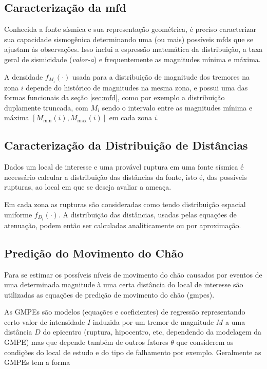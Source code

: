 \subsection{Caracterização da \glsdesc*{mfd}}
\label{sec:psha_mfd}

Conhecida a fonte sísmica e sua representação geométrica, é preciso caracterizar sua capacidade sismogênica determinando
uma (ou mais) possíveis \gls{mfd}s que se ajustam às observações. Isso inclui a espressão matemática da distribuição, a
taxa geral de sismicidade (\emph{valor-a}) e frequentemente as magnitudes mínima e máxima. 


A densidade $f_{M_i}(\cdot)$ usada para a distribuição de magnitude dos tremores na zona $i$ depende do 
histórico de magnitudes na mesma zona, e possui uma das formas funcionais da seção \ref{sec:mfd},
como por exemplo a distribuição duplamente truncada,
com $M_i$ sendo o intervalo entre as magnitudes mínima e máxima $[M_{\min}(i), M_{\max}(i)]$ 
em cada zona $i$.


\subsection{Caracterização da Distribuição de Distâncias}
\label{sec:psha_distances}

Dados um local de interesse e uma provável ruptura em uma fonte sísmica é necessário calcular a distribuição das
distâncias da fonte, isto é, das possíveis rupturas, ao local em que se deseja avaliar a ameaça.

Em cada zona as rupturas são consideradas como tendo distribuição espacial uniforme $f_{D_i}(\cdot)$.
A distribuição das distâncias, usadas pelas equações de atenuação, podem então ser calculadas 
analiticamente ou por aproximação.


\subsection{Predição do Movimento do Chão}
\label{sec:gmpe}

Para se estimar os possíveis níveis de movimento do chão causados por eventos de uma determinada magnitude à uma certa
distância do local de interesse são utilizadas as equações de predição de movimento do chão (\glspl{gmpe}).

As GMPEs são modelos (equações e coeficientes) de regressão representando certo valor de
intensidade $I$ induzida por um tremor de magnitude $M$ a uma distância $D$ do epicentro (ruptura, hipocentro, etc, dependendo da
modelagem da GMPE) mas que depende também de outros fatores $\theta$ que considerem as condições
do local de estudo e do tipo de falhamento por exemplo. Geralmente as GMPEs tem a forma

